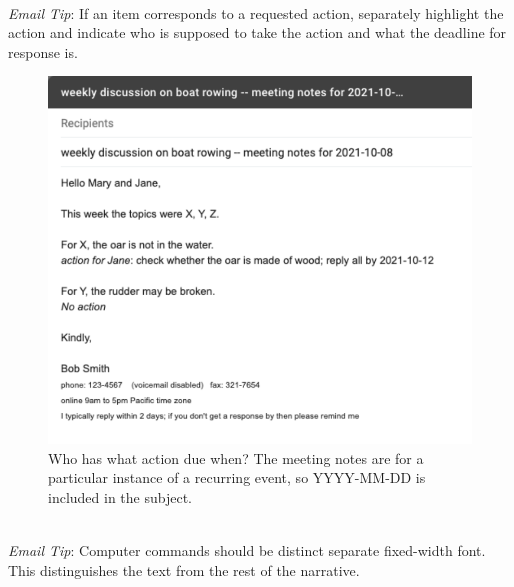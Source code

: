 \ \\
\textit{Email Tip}: If an item corresponds to a requested action, separately highlight the action and indicate who is supposed to take the action and what the deadline for response is.

\begin{figure}
\includegraphics[width=1\textwidth]{images/email_meeting_notes.pdf}
\caption{Who has what action due when? The meeting notes are for a particular instance of a recurring event, so YYYY-MM-DD is included in the subject.}
\label{fig:email_meeting_notes}
\end{figure}

\ \\
\textit{Email Tip}: Computer commands should be distinct separate fixed-width font. This distinguishes the text from the rest of the narrative. 


